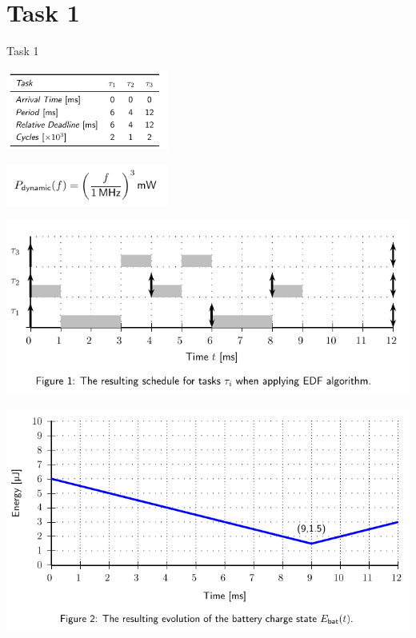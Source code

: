 
\section{Task 1}

\setcounter{task}{1}

\begin{frame}[allowframebreaks]{Task 1}{}
  \begin{tasknoinc}
    \centering
    \includegraphics[width=0.4\textwidth]{./figures/task1_tasks.png}

    \includegraphics[width=0.4\textwidth]{./figures/task1_power.png}
  \end{tasknoinc}
  \begin{solutionnoinc}
    \centering
    \includegraphics[height=0.6\paperheight]{./figures/task1_schedule.png}
  \end{solutionnoinc}

  \begin{solutionnoinc}
    \centering
    \includegraphics[height=0.6\paperheight]{./figures/task1_energy.png}
  \end{solutionnoinc}
\end{frame}
